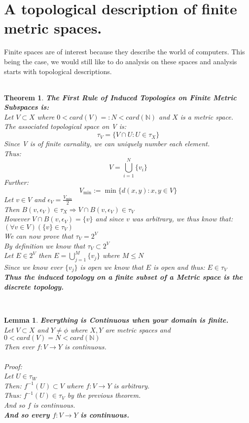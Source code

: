 \documentclass[12pt]{extarticle}
\theoremstyle{plain}
\newtheorem{thm}{Theorem}[section]
\theoremstyle{plain}
\theoremstyle{plain}
\newtheorem{lma}{Lemma}[section]
\theoremstyle{Definition}
\theoremstyle{Definition}
\theoremstyle{plain}
\newcommand{\cut}[0]{\noindent\framebox[\linewidth]{\rule{\linewidth}{2pt}}\\}
\begin{document}
	\section{A topological description of finite metric spaces.}
	Finite spaces are of interest because they describe the world of computers. This being the case, we would still like to do analysis on these spaces and analysis starts with topological descriptions. \\
	\cut
	\begin{thm} \textbf{The First Rule of Induced Topologies on Finite Metric Subspaces is:} \\
		Let $V \subset X$ where $0 < card(V) =: N < card(\mathbb{N})$ and $X$ is a metric space. \\
		The associated topological space on V is: 
		$$\tau_V = \{V \cap U : U \in \tau_X\}$$
		Since V is of finite carnality, we can uniquely number each element. \\ 
		Thus:
		$$V = \bigcup_{i=1}^N \{v_i\}$$
		Further: 
		$$V_{\min} := \min\{d(x,y) : x,y \in V\} $$
		Let $v \in V$ and $\epsilon_V = \frac{V_{\min}}{2}$ \\ 
		Then $B(v,\epsilon_V) \in \tau_X \Rightarrow V \cap B(v,\epsilon_V) \in \tau_V$ \\ 
		However $V \cap B(v,\epsilon_V)  = \{v\}$ and since $v$ was arbitrary, we thus know that: $(\forall v \in V)(\{v\} \in \tau_V)$ \\
		We can now prove that $\tau_V = 2^V$ \\ 
		By definition we know that $\tau_V \subset 2^V$ \\ 
		Let $E \in 2^V$ then $E = \bigcup_{j=1}^M \{v_j\}$ where $M \leq N$ \\ 
		Since we know ever $\{v_j\}$ is open we know that $E$ is open and thus: $E \in \tau_V$ \\ 
		\textbf{Thus the induced topology on a finite subset of a Metric space is the discrete topology. }		
	\end{thm}
	\cut
	\begin{lma} \textbf{Everything is Continuous when your domain is finite.} \\ 
			Let $V \subset X$ and $Y \not = \phi$ where $X,Y$ are metric spaces and $0 < card(V) = N < card(\mathbb{N})$ \\
			Then ever $f : V \to Y$ is continuous. \\ \\
			Proof: \\ 
			Let $U \in \tau_W$ \\ 
			Then: $f^{-1}(U) \subset V$ where $f : V \to Y$ is arbitrary. \\
			Thus: $f^{-1}(U) \in \tau_V$ by the previous theorem. \\
			And so $f$ is continuous. \\
			\textbf{And so every $f : V \to Y$ is continuous. }
	\end{lma}
\end{document}
